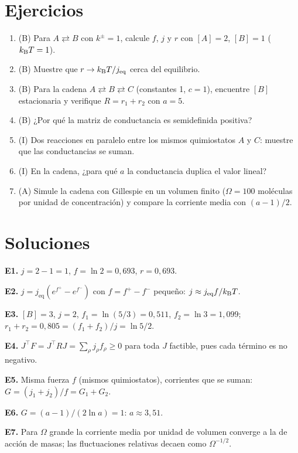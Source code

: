 \documentclass[11pt,a4paper]{article}
\begin{document}
\section{Ejercicios}
\begin{enumerate}[label=\textbf{E\arabic*.}]
\item (B) Para $A\rightleftarrows B$ con $k^\pm=1$, calcule $f$, $j$ y $r$ con $[A]=2$, $[B]=1$ ($k_{\mathrm B} T=1$).
\item (B) Muestre que $r\to k_{\mathrm B} T/j_{\text{eq}}$ cerca del equilibrio.
\item (B) Para la cadena $A\rightleftarrows B\rightleftarrows C$ (constantes 1, $c=1$), encuentre $[B]$ estacionaria y verifique $R=r_1+r_2$ con $a=5$.
\item (B) ¿Por qué la matriz de conductancia es semidefinida positiva?
\item (I) Dos reacciones en paralelo entre los mismos quimiostatos $A$ y $C$: muestre que las conductancias se suman.
\item (I) En la cadena, ¿para qué $a$ la conductancia duplica el valor lineal?
\item (A) Simule la cadena con Gillespie en un volumen finito ($\Omega=100$ moléculas por unidad de concentración) y compare la corriente media con $(a-1)/2$.
\end{enumerate}
\section{Soluciones}
\begin{solucion}
\textbf{E1.} $j=2-1=1$, $f=\ln2=0{,}693$, $r=0{,}693$.

\textbf{E2.} $j=j_{\text{eq}}(e^{f^+}-e^{f^-})$ con $f=f^+-f^-$ pequeño: $j\approx j_{\text{eq}}f/k_{\mathrm B} T$.

\textbf{E3.} $[B]=3$, $j=2$, $f_1=\ln(5/3)=0{,}511$, $f_2=\ln3=1{,}099$; $r_1+r_2=0{,}805=(f_1+f_2)/j=\ln5/2$.

\textbf{E4.} $J^\top F=J^\top RJ=\sum_\rho j_\rho f_\rho\ge0$ para toda $J$ factible, pues cada término es no negativo.

\textbf{E5.} Misma fuerza $f$ (mismos quimiostatos), corrientes que se suman: $G=(j_1+j_2)/f=G_1+G_2$.

\textbf{E6.} $G=(a-1)/(2\ln a)=1$: $a\approx3{,}51$.

\textbf{E7.} Para $\Omega$ grande la corriente media por unidad de volumen converge a la de acción de masas; las fluctuaciones relativas decaen como $\Omega^{-1/2}$.
\end{solucion}
\end{document}
